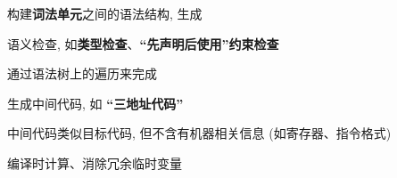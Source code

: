 \begin{frame}{}
  \begin{center}
     构建{\bf 词法单元}之间的语法结构, 生成

    \vspace{0.80cm}
  \end{center}
\end{frame}

\begin{frame}{}
  \begin{center}
     语义检查, 如{\bf 类型检查}、{\bf ``先声明后使用''约束检查}

    \vspace{0.80cm}

    \vspace{0.30cm}
    通过语法树上的遍历来完成
  \end{center}
\end{frame}

\begin{frame}{}
  \begin{center}
     生成中间代码, 如 {\bf ``三地址代码''}

    \vspace{0.80cm}

    \vspace{0.30cm}
    中间代码类似目标代码, 但不含有机器相关信息 (如寄存器、指令格式)
  \end{center}
\end{frame}

\begin{frame}{}
  \begin{center}

    \vspace{0.80cm}

    \vspace{0.30cm}
    编译时计算、消除冗余临时变量
  \end{center}
\end{frame}

